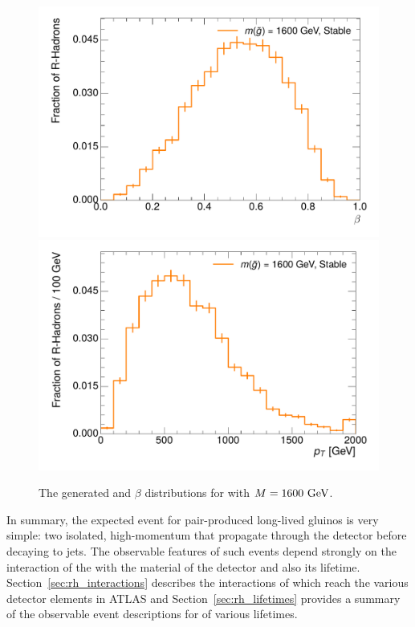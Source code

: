\begin{figure}
\centering
\includegraphics[width=\halffig]{figures/rhad_beta.pdf}
\includegraphics[width=\halffig]{figures/rhad_pt.pdf}
\caption{The generated \pt and $\beta$ distributions for \rhadrons with $M = 1600\ \GeV$.}
\label{fig:rhad_truth}
\end{figure}

In summary, the expected event for pair-produced long-lived gluinos is very simple: two isolated, high-momentum \rhadrons that propagate through the detector before decaying to jets.
The observable features of such events depend strongly on the interaction of the \rhadron with the material of the detector and also its lifetime.
Section~\ref{sec:rh_interactions} describes the interactions of \rhadrons which reach the various detector elements in ATLAS and Section~\ref{sec:rh_lifetimes} provides a summary of the observable event descriptions for \rhadrons of various lifetimes.

